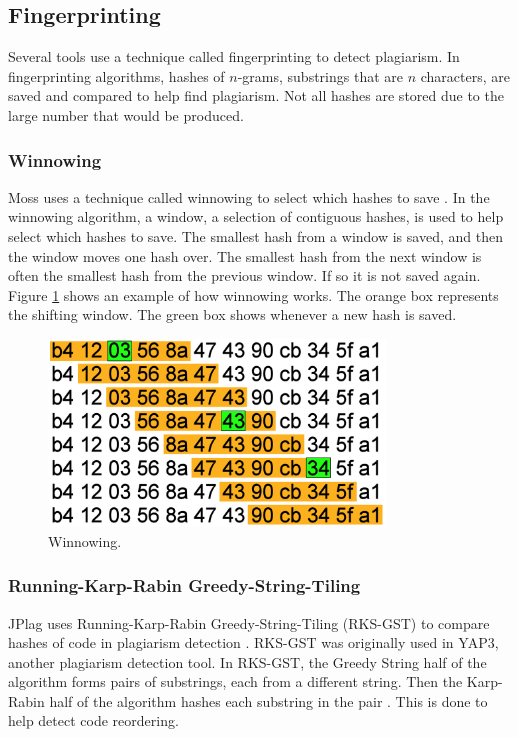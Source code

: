 \documentclass[10pt,journal,compsoc]{IEEEtran}
\begin{document}
		\subsection{Fingerprinting}
		Several tools use a technique called fingerprinting to detect plagiarism. In fingerprinting algorithms, hashes of $n$-grams, substrings that are $n$ characters, are saved and compared to help find plagiarism. Not all hashes are stored due to the large number that would be produced. 
		
			\subsubsection{Winnowing}
			Moss uses a technique called winnowing to select which hashes to save \cite{schleimer+wilkerson+aiken}. In the winnowing algorithm, a window, a selection of contiguous hashes, is used to help select which hashes to save. The smallest hash from a window is saved, and then the window moves one hash over. The smallest hash from the next window is often the smallest hash from the previous window. If so it is not saved again. Figure \ref{fig:winnowing1} shows an example of how winnowing works. The orange box represents the shifting window. The green box shows whenever a new hash is saved.
		
			\begin{figure}[h!]
				\includegraphics[width=0.8\textwidth]{Winnowing.png}
				\caption{Winnowing.}
				\label{fig:winnowing1}
			\end{figure}
		
			\subsubsection{Running-Karp-Rabin Greedy-String-Tiling}
			JPlag uses Running-Karp-Rabin Greedy-String-Tiling (RKS-GST) to compare hashes of code in plagiarism detection \cite{prechelt+malpohl+philippsen}. RKS-GST was originally used in YAP3, another plagiarism detection tool. In RKS-GST, the Greedy String half of the algorithm forms pairs of substrings, each from a different string. Then the Karp-Rabin half of the algorithm hashes each substring in the pair \cite{wise}. This is done to help detect code reordering.
		
\end{document}
